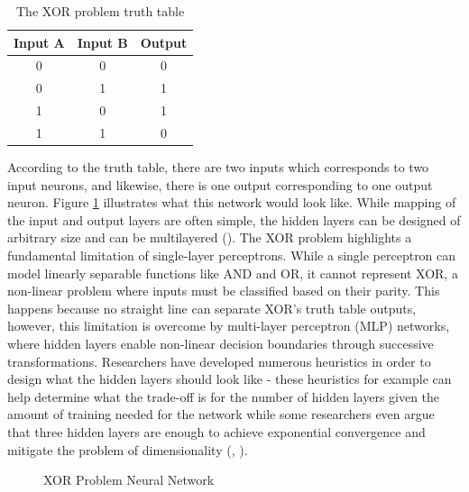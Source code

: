 \parbreak
\begin{table}[H]
    \caption{The XOR problem truth table}
    \label{tab:xor_truth_table}
    \centering
    \begin{tabular}{|c|c|c|}
    \hline
    \textbf{Input A} & \textbf{Input B} & {\color[HTML]{BB5251} \textbf{Output}} \\ \hline
    0                & 0                & {\color[HTML]{BB5251} 0}               \\ \hline
    0                & 1                & {\color[HTML]{BB5251} 1}               \\ \hline
    1                & 0                & {\color[HTML]{BB5251} 1}               \\ \hline
    1                & 1                & {\color[HTML]{BB5251} 0}               \\ \hline
    \end{tabular}
\end{table}

\parbreak\noindent According to the truth table, there are two inputs which corresponds to two input neurons, and likewise, there is one output corresponding to one output neuron. Figure \ref{fig:ne_xor_network} illustrates what this network would look like. While mapping of the input and output layers are often simple, the hidden layers can be designed of arbitrary size and can be multilayered (\cite{nielsen2015neural}). The XOR problem highlights a fundamental limitation of single-layer perceptrons. While a single perceptron can model linearly separable functions like AND and OR, it cannot represent XOR, a non-linear problem where inputs must be classified based on their parity. This happens because no straight line can separate XOR's truth table outputs, however, this limitation is overcome by multi-layer perceptron (MLP) networks, where hidden layers enable non-linear decision boundaries through successive transformations. Researchers have developed numerous heuristics in order to design what the hidden layers should look like - these heuristics for example can help determine what the trade-off is for the number of hidden layers given the amount of training needed for the network while some researchers even argue that three hidden layers are enough to achieve exponential convergence and mitigate the problem of dimensionality (\cite{nielsen2015neural}, \cite{shen2021neural}).

\parbreak
\begin{figure}[H] %
    \centering %
    \caption{XOR Problem Neural Network}
    \label{fig:ne_xor_network} %
\end{figure}

